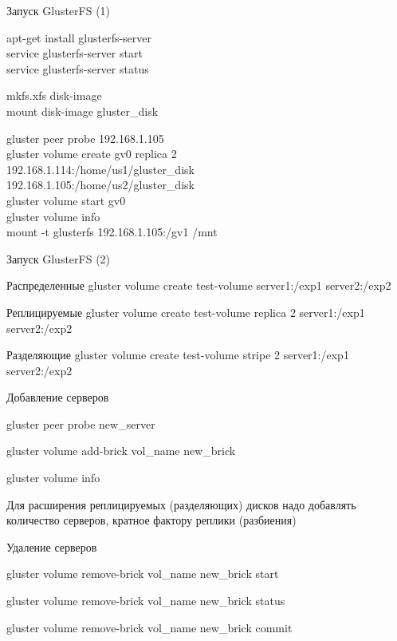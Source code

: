 \documentclass[sans]{beamer}
\begin{document}
\begin{frame}{Запуск GlusterFS (1)}
\footnotesize
	\begin{block}{}
		apt-get install glusterfs-server\\
		service glusterfs-server start\\
		service glusterfs-server status\\
	\end{block}
	\pause
	\begin{block}{}
		mkfs.xfs disk-image\\
		mount disk-image gluster\_disk\\
	\end{block}
	\pause
	\begin{block}{}
		gluster peer probe 192.168.1.105\\
		\vspace{0.2cm}
		gluster volume create gv0 replica 2\\
		            192.168.1.114:/home/us1/gluster\_disk\\
		            192.168.1.105:/home/us2/gluster\_disk\\

		\vspace{0.2cm}
		gluster volume start gv0\\
		gluster volume info\\

		mount -t glusterfs 192.168.1.105:/gv1 /mnt
	\end{block}
\end{frame}

\begin{frame}{Запуск GlusterFS (2)}
	\begin{block}{Распределенные}
		 gluster volume create test-volume server1:/exp1 server2:/exp2
	\end{block}
	\begin{block}{Реплицируемые}
		 gluster volume create test-volume replica 2 server1:/exp1 server2:/exp2
	\end{block}
	\begin{block}{Разделяющие}
		 gluster volume create test-volume stripe 2 server1:/exp1 server2:/exp2
	\end{block}
\end{frame}

\begin{frame}{Добавление серверов}
	\begin{block}{} 
		 gluster peer probe new\_server

		\pause
		 gluster volume add-brick vol\_name new\_brick

		\pause
		 gluster volume info
	\end{block}
	\pause
	\vspace{1cm}
	Для расширения реплицируемых (разделяющих) дисков надо добавлять количество серверов, кратное фактору реплики (разбиения)
\end{frame}

\begin{frame}{Удаление серверов}
	\begin{block}{} 
		 gluster volume remove-brick vol\_name new\_brick start

		\pause
		 gluster volume remove-brick vol\_name new\_brick status

		\pause
		 gluster volume remove-brick vol\_name new\_brick commit
	\end{block}
\end{frame}
\end{document}
